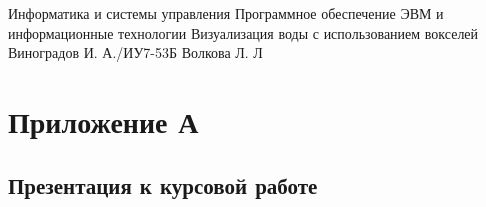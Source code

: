 \documentclass{bmstu}
\begin{document}
\renewcommand{\thelstlisting}{\arabic{lstlisting}}

\makecourseworktitle
    {Информатика и системы управления}
    {Программное обеспечение ЭВМ и информационные технологии}
    {Визуализация воды с использованием вокселей}
    {Виноградов И. А./ИУ7-53Б} 
    {Волкова Л. Л} 
    {} 

\setcounter{page}{3}
\maketableofcontents








\makebibliography

\chapter*{Приложение А}
\section*{Презентация к курсовой работе}
\end{document}

